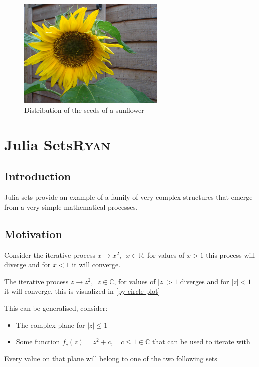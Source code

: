 \documentclass[a4paper,11pt,twoside]{article}
\begin{document}
\begin{figure}[htbp]
\centering
\includegraphics[width=7cm]{media/sunflower.jpg}
\caption{\label{sunflower}Distribution of the seeds of a sunflower \cite{simonbrassCCSearch2006}}
\end{figure}

\section{Julia Sets\hfill{}\textsc{Ryan}}
\label{sec:org8758b63}
\subsection{Introduction}
\label{sec:org119daa5}
Julia sets provide an example of a family of very complex structures that emerge from a very simple mathematical processes.
\subsection{Motivation}
\label{sec:orgfc091d5}
Consider the iterative process \(x \rightarrow x^{2}, \enspace x \in \mathbb{R}\),
for values of \(x>1\) this process will diverge and for \(x<1\) it will converge.

The iterative process \(z \rightarrow z^{2}, \enspace z \in \mathbb{C}\),
for values of \(\left\lvert z \right\rvert >1\) diverges and for \(\left\lvert z \right\rvert <1\) it will converge, this is visualized in \ref{py-circle-plot}

This can be generalised, consider:

\begin{itemize}
\item The complex plane for \(\left\lvert z \right\rvert \leq 1\)
\item Some function \(f_{c}(z) = z^{2} + c, \quad c \leq 1 \in \mathbb{C}\) that can be used to iterate with
\end{itemize}

Every value on that plane will belong to one of the two following sets
\end{document}
